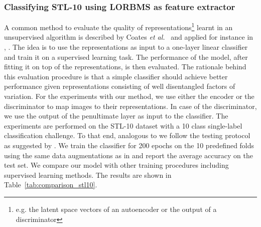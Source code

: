 \documentclass[12pt,a4paper]{article}
\begin{document}
\subsubsection{Classifying STL-10 using LORBMS as feature extractor}\label{subsec:linearclassifier}
A common method to evaluate the quality of representations\footnote{e.g. the latent space vectors of an autoencoder or the output of a discriminator} learnt in an unsupervised algorithm is described by Coates \textit{et al.}~\cite{singleLayerNetworks} and applied for instance in \cite{DCGAN}, \cite{AE_Interp} . The idea is to use the representations as input to a one-layer linear classifier and train it on a supervised learning task. The performance of the model, after fitting it on top of the representations, is then evaluated. The rationale behind this evaluation procedure is that a simple classifier should achieve better performance given representations consisting of well disentangled factors of variation. For the experiments with our method, we use either the encoder or the discriminator to map images to their representations. In case of the discriminator, we use the output of the penultimate layer as input to the classifier. The experiments are performed on the STL-10 dataset with a 10 class single-label classification challenge. To that end, analogous to \cite{SpotArtifacts} we follow the testing protocol as suggested by \cite{singleLayerNetworks}. We train the classifier for 200 epochs on the 10 predefined folds using the same data augmentations as in \cite{SpotArtifacts} and report the average accuracy on the test set. We compare our model with other training procedures including supervised learning methods. The results are shown in Table~\ref{tab:comparison_stl10}.
\end{document}
